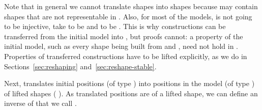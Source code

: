 Note that in general we cannot translate  shapes into  shapes
because  may contain shapes that are not representable in .
Also, for most of the models,  is not going to be injective, \eg{}
take  to be  and  to be \AF{*}.  This is why constructions
can be transferred from the initial model into , but proofs cannot: a
property of the initial model, such as every shape being built from  and
, need not hold in .  Properties of transferred constructions
have to be lifted explicitly, as we do in Sections~\ref{sec:reshaping}
and~\ref{sec:reshape-stable}.

Next,  translates initial positions (of type  ) into
positions in the model  (of type ) of lifted shapes
(  ).  As translated positions are of a lifted shape,
we can define an inverse of  that we call .
